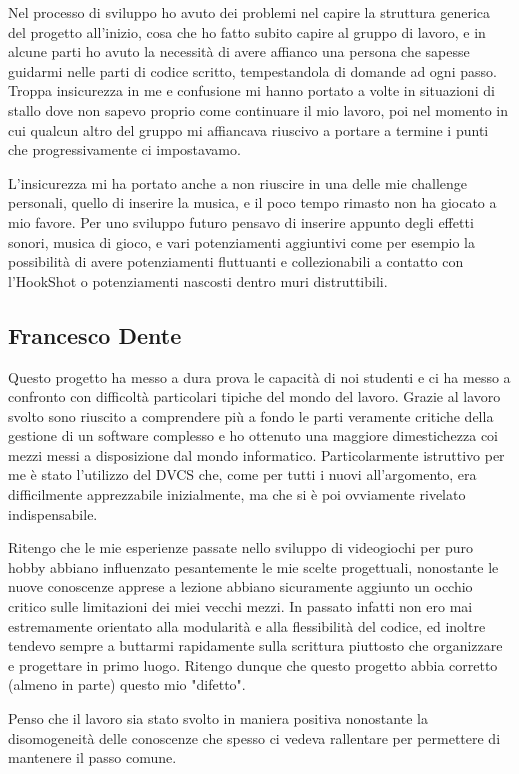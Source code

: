 \documentclass[a4paper,12pt]{report}
\begin{document}
Nel processo di sviluppo ho avuto dei problemi nel capire la struttura generica del progetto all'inizio, cosa che ho fatto subito capire al gruppo di lavoro, e in alcune parti ho avuto la necessità di avere affianco una persona che sapesse guidarmi nelle parti di codice scritto, tempestandola di domande ad ogni passo.
Troppa insicurezza in me e confusione mi hanno portato a volte in situazioni di stallo dove non sapevo proprio come continuare il mio lavoro, poi nel momento in cui qualcun altro del gruppo mi affiancava riuscivo a portare a termine i punti che progressivamente ci impostavamo.

L'insicurezza mi ha portato anche a non riuscire in una delle mie challenge personali, quello di inserire la musica, e il poco tempo rimasto non ha giocato a mio favore.
Per uno sviluppo futuro pensavo di inserire appunto degli effetti sonori, musica di gioco, e vari potenziamenti aggiuntivi come per esempio la possibilità di avere potenziamenti fluttuanti e collezionabili a contatto con l'HookShot o potenziamenti nascosti dentro muri distruttibili.

\subsection*{Francesco Dente}
Questo progetto ha messo a dura prova le capacità di noi studenti e ci ha messo a confronto con difficoltà particolari tipiche del mondo del lavoro.
Grazie al lavoro svolto sono riuscito a comprendere più a fondo le parti veramente critiche della gestione di un software complesso e ho ottenuto una maggiore dimestichezza coi mezzi messi a disposizione dal mondo informatico.
Particolarmente istruttivo per me è stato l'utilizzo del DVCS che, come per tutti i nuovi all'argomento, era difficilmente apprezzabile inizialmente, ma che si è poi ovviamente rivelato indispensabile.

Ritengo che le mie esperienze passate nello sviluppo di videogiochi per puro hobby abbiano influenzato pesantemente le mie scelte progettuali, nonostante le nuove conoscenze apprese a lezione abbiano sicuramente aggiunto un occhio critico sulle limitazioni dei miei vecchi mezzi.
In passato infatti non ero mai estremamente orientato alla modularità e alla flessibilità del codice, ed inoltre tendevo sempre a buttarmi rapidamente sulla scrittura piuttosto che organizzare e progettare in primo luogo.
Ritengo dunque che questo progetto abbia corretto (almeno in parte) questo mio "difetto".

Penso che il lavoro sia stato svolto in maniera positiva nonostante la disomogeneità delle conoscenze che spesso ci vedeva rallentare per permettere di mantenere il passo comune.
\end{document}

